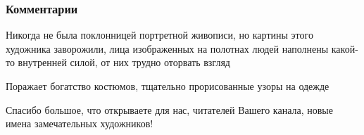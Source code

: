  
 
 
 
 
\subsubsection{Комментарии}
\label{sec:07_10_2020.sites.ru.zen_yandex.yz.pozitiv_krasok_daria_orlova.1.russkii_duh_zhivopis_andrei_shishkin.comments}

\begin{itemize}

Никогда не была поклонницей портретной живописи, но картины этого художника
заворожили, лица изображенных на полотнах людей наполнены какой-то внутренней
силой, от них трудно оторвать взгляд

Поражает богатство костюмов, тщательно прорисованные узоры на одежде

Спасибо большое, что открываете для нас, читателей Вашего канала, новые имена
замечательных художников!
\end{itemize}
